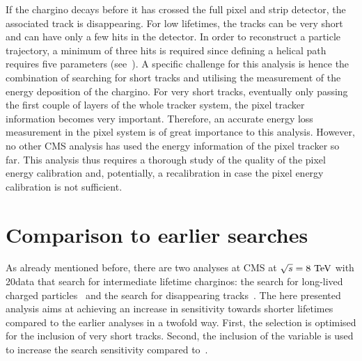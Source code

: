If the chargino decays before it has crossed the full pixel and strip detector, the associated track is disappearing. 
For low lifetimes, the tracks can be very short and can have only a few hits in the detector. 
In order to reconstruct a particle trajectory, a minimum of three hits is required since defining a helical path requires five parameters (see~\cite{bib:CMS:tracking_8TeV}). 
A specific challenge for this analysis is hence the combination of searching for short tracks and utilising the measurement of the energy deposition of the chargino. 
For very short tracks, eventually only passing the first couple of layers of the whole tracker system, the pixel tracker information becomes very important. 
Therefore, an accurate energy loss measurement in the pixel system is of great importance to this analysis. 
However, no other CMS analysis has used the energy information of the pixel tracker so far.
This analysis thus requires a thorough study of the quality of the pixel energy calibration and, potentially, a recalibration in case the pixel energy calibration is not sufficient.



\section{Comparison to earlier searches}
As already mentioned before, there are two analyses at CMS at $\sqrt{s}=8\,\,\text{Te}\kern-0.06667em\text{V}$ with 20\fbinv data that search for intermediate lifetime charginos: the search for long-lived charged particles~\cite{bib:CMS:HSCP_8TeV} and the search for disappearing tracks~\cite{bib:CMS:DT_8TeV}.
The here presented analysis aims at achieving an increase in sensitivity towards shorter lifetimes compared to the earlier analyses in a twofold way.
First, the selection is optimised for the inclusion of very short tracks.
Second, the inclusion of the variable \dedx is used to increase the search sensitivity compared to~\cite{bib:CMS:DT_8TeV}.\\

